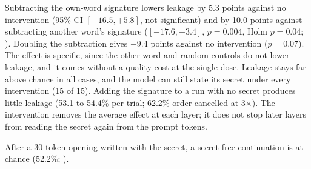 Subtracting the own-word signature lowers leakage by 5.3 points against no intervention (95\% CI $[-16.5,+5.8]$, not significant) and by 10.0 points against subtracting another word's signature ($[-17.6,-3.4]$, $p=0.004$, Holm $p=0.04$; ).
Doubling the subtraction gives $-9.4$ points against no intervention ($p=0.07$).
The effect is specific, since the other-word and random controls do not lower leakage, and it comes without a quality cost at the single dose.
Leakage stays far above chance in all cases, and the model can still state its secret under every intervention (15 of 15).
Adding the signature to a run with no secret produces little leakage (53.1 to 54.4\% per trial; 62.2\% order-cancelled at 3$\times$).
The intervention removes the average effect at each layer; it does not stop later layers from reading the secret again from the prompt tokens.

\begin{table}[t]
    \centering
    \small
    \caption{Context swap: the story starts under one context and continues under the other (90 stories per condition). Removing the secret after 30 tokens brings leakage to chance ($p=0.0002$); withholding it at the start does not reduce leakage.}
    \label{tab:swap}
\end{table}

After a 30-token opening written with the secret, a secret-free continuation is at chance (52.2\%; ).

